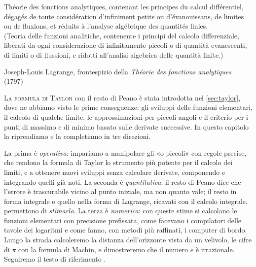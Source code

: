 
\epigraph{Théorie des fonctions analytiques, contenant les principes du calcul
différentiel, dégagés de toute considération d'infiniment petits ou d'évanouissans, de
limites ou de fluxions, et réduits à l'analyse algébrique des quantités finies.\\[2pt]
\upshape(Teoria delle funzioni analitiche, contenente i principi del calcolo
differenziale, liberati da ogni considerazione di infinitamente piccoli o di quantità
evanescenti, di limiti o di flussioni, e ridotti all'analisi algebrica delle quantità
finite.)}{Joseph-Louis Lagrange, frontespizio della \emph{Théorie des fonctions
analytiques} (1797)}

\lettrine[lines=3, findent=2pt, nindent=0pt]{L}{a formula di Taylor} con il resto di
Peano è stata introdotta nel \cref{sec:taylor}, dove ne abbiamo visto le prime
conseguenze: gli sviluppi delle funzioni elementari, il calcolo di qualche limite, le
approssimazioni per piccoli angoli e il criterio per i punti di massimo e di minimo
basato sulle derivate successive. In questo capitolo la riprendiamo e la completiamo in
tre direzioni.

La prima è \emph{operativa}: impariamo a manipolare gli «o piccoli» con regole precise,
che rendono la formula di Taylor lo strumento più potente per il calcolo dei limiti, e
a ottenere nuovi sviluppi senza calcolare derivate, componendo e integrando quelli già
noti. La seconda è \emph{quantitativa}: il resto di Peano dice che l'errore è
trascurabile vicino al punto iniziale, ma non quanto vale; il resto in forma integrale e
quello nella forma di Lagrange, ricavati con il calcolo integrale, permettono di
\emph{stimarlo}. La terza è \emph{numerica}: con queste stime si calcolano le funzioni
elementari con precisione prefissata, come facevano i compilatori delle tavole dei
logaritmi e come fanno, con metodi più raffinati, i computer di bordo. Lungo la
strada calcoleremo la distanza dell'orizzonte vista da un velivolo, le cifre di $\pi$ con
la formula di Machin, e dimostreremo che il numero $e$ è irrazionale. Seguiremo il testo
di riferimento \cite{marcellini-sbordone}.


